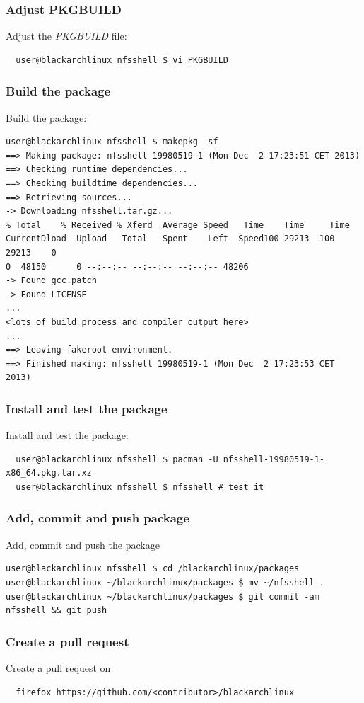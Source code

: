\documentclass[a4paper, oneside, 11pt]{book}
\def\href#1#2{\htmladdnormallink{#2}{#1}}
\begin{document}
\subsubsection{Adjust PKGBUILD}
Adjust the \textit{PKGBUILD} file:
\begin{lstlisting}
  user@blackarchlinux nfsshell $ vi PKGBUILD
\end{lstlisting}

\subsubsection{Build the package}
Build the package:
\begin{lstlisting}user@blackarchlinux nfsshell $ makepkg -sf
==> Making package: nfsshell 19980519-1 (Mon Dec  2 17:23:51 CET 2013)
==> Checking runtime dependencies...
==> Checking buildtime dependencies...
==> Retrieving sources...
-> Downloading nfsshell.tar.gz...
% Total    % Received % Xferd  Average Speed   Time    Time     Time
CurrentDload  Upload   Total   Spent    Left  Speed100 29213  100 29213    0
0  48150      0 --:--:-- --:--:-- --:--:-- 48206
-> Found gcc.patch
-> Found LICENSE
...
<lots of build process and compiler output here>
...
==> Leaving fakeroot environment.
==> Finished making: nfsshell 19980519-1 (Mon Dec  2 17:23:53 CET 2013)
\end{lstlisting}

\subsubsection{Install and test the package}
Install and test the package:
\begin{lstlisting}
  user@blackarchlinux nfsshell $ pacman -U nfsshell-19980519-1-x86_64.pkg.tar.xz
  user@blackarchlinux nfsshell $ nfsshell # test it
\end{lstlisting}

\subsubsection{Add, commit and push package}
Add, commit and push the package
\begin{lstlisting}user@blackarchlinux nfsshell $ cd /blackarchlinux/packages
user@blackarchlinux ~/blackarchlinux/packages $ mv ~/nfsshell .
user@blackarchlinux ~/blackarchlinux/packages $ git commit -am nfsshell && git push
\end{lstlisting}

\subsubsection{Create a pull request}
Create a pull request on \href{https://github.com/}{github.com}
\begin{lstlisting}
  firefox https://github.com/<contributor>/blackarchlinux
\end{lstlisting}
\end{document}
